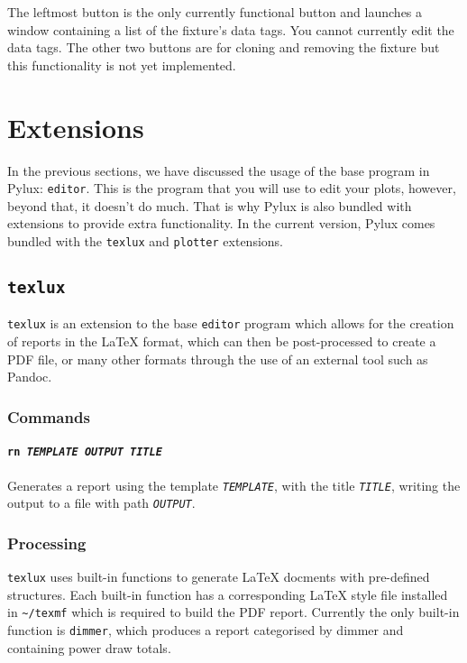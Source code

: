 \documentclass[a4paper]{article}
\begin{document}
The leftmost button is the only currently functional button and launches a 
window containing a list of the fixture's data tags. You cannot currently 
edit the data tags. The other two buttons are for cloning and removing the 
fixture but this functionality is not yet implemented.

\section{Extensions}
In the previous sections, we have discussed the usage of the base program in 
Pylux: \texttt{editor}. This is the program that you will use to edit your
plots, however, beyond that, it doesn't do much. That is why Pylux is also 
bundled with extensions to provide extra functionality. In the current 
version, Pylux comes bundled with the \texttt{texlux} and \texttt{plotter} 
extensions.

\subsection{\texttt{texlux}}
\texttt{texlux} is an extension to the base \texttt{editor} program which 
allows for the creation of reports in the \LaTeX{} format, which can then be 
post-processed to create a PDF file, or many other formats through the use 
of an external tool such as Pandoc.

\subsubsection{Commands}

\paragraph{\texttt{rn \textit{TEMPLATE OUTPUT TITLE}}}
Generates a report using the template \texttt{\textit{TEMPLATE}}, with the 
title \texttt{\textit{TITLE}}, writing the output to a file with path 
\texttt{\textit{OUTPUT}}.

\subsubsection{Processing}

\texttt{texlux} uses built-in functions to generate \LaTeX{} docments with 
pre-defined structures. Each built-in function has a corresponding \LaTeX{} 
style file installed in \texttt{\~{}/texmf} which is required to build 
the PDF report. Currently the only built-in function is \texttt{dimmer}, 
which produces a report categorised by dimmer and containing power draw 
totals.
\end{document}
